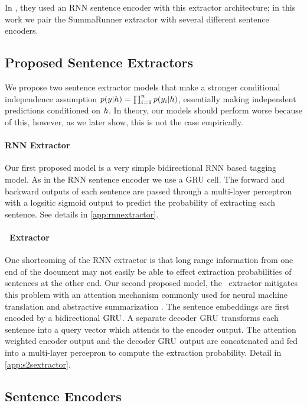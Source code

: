 In \cite{nallapati2017summarunner}, they used an RNN sentence encoder with 
this extractor architecture; in this work we pair the SummaRunner extractor
with several different sentence encoders.


\subsection{Proposed Sentence Extractors}
We propose two sentence extractor models that 
make a stronger conditional independence 
assumption $p(\slabel|\sentEmb)=\prod_{i=1}^\docSize p(\slabel[i]|\sentEmb)$,
essentially making independent predictions conditioned on $\sentEmb$.
In theory, our models should perform worse because of this, however, as
we later show, this is not the case empirically.

\paragraph{RNN Extractor}
    Our first proposed model is a very simple bidirectional
RNN based tagging model. As in the RNN sentence encoder we use a GRU cell.
The forward and backward outputs of each sentence are passed through a 
multi-layer perceptron with a logsitic sigmoid output 
to predict the probability
of extracting each sentence. See details in \autoref{app:rnnextractor}.

\paragraph{\sts~Extractor} One shortcoming of the RNN extractor is that long range
information from one end of the document may not easily be able to effect 
extraction probabilities of sentences at the other end. 
Our second proposed model, the \sts~extractor mitigates this problem with an 
attention 
mechanism commonly
used for neural machine translation \cite{bahdanau2014neural} and 
abstractive summarization \cite{see2017get}. 
The sentence embeddings are first
encoded by a bidirectional $\operatorname{GRU}$. A separate decoder $\operatorname{GRU}$ transforms each 
sentence into a query vector which attends to the encoder output. The
attention weighted encoder output and the decoder $\operatorname{GRU}$ output are concatenated
and fed into a multi-layer percepron to compute the extraction probability.
Detail in \autoref{app:s2sextractor}.


\subsection{Sentence Encoders}



